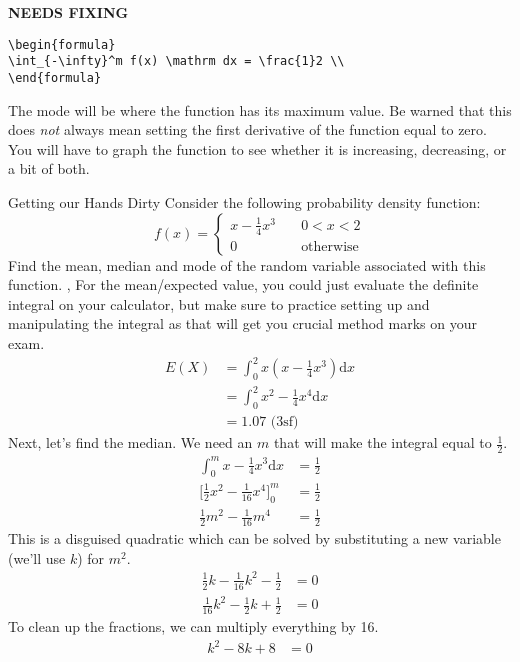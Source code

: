 {\hfill\Large\bfseries NEEDS FIXING\hfill}
\begin{lstlisting}
\begin{formula}
\int_{-\infty}^m f(x) \mathrm dx = \frac{1}2 \\
\end{formula}
 \end{lstlisting}
The mode will be where the function has its maximum value. Be warned that this does \textit{not} always mean setting the first derivative of the function equal to zero. You will have to graph the function to see whether it is increasing, decreasing, or a bit of both.
\begin{example}{Getting our Hands Dirty}
Consider the following probability density function:
$$f(x) = 
        \begin{cases}
            x - \frac{1}{4}x^3 & \quad 0 < x < 2 \\
            0 & \quad \text{otherwise}
        \end{cases}
$$
Find the mean, median and mode of the random variable associated with this function. 
\sep
For the mean/expected value, you could just evaluate the definite integral on your calculator, but make sure to practice setting up and manipulating the integral as that will get you crucial method marks on your exam.
\begin{align}
    E(X) &= \int_0^2 x(x - \frac{1}{4}x^3) \mathrm dx \\
    &= \int_0^2 x^2- \frac{1}{4}x^4 \mathrm dx \\
    &= 1.07 \text{ (3sf)}
\end{align}
Next, let's find the median. We need an $m$ that will make the integral equal to $\frac{1}2$.
\begin{align}
    \int_0^m x - \frac{1}{4}x^3 \mathrm dx &= \frac{1}2 \\
    \Big[\frac{1}{2}x^2 - \frac{1}{16}x^4\Big]_0^m &= \frac{1}2 \\
    \frac{1}{2}m^2 - \frac{1}{16}m^4 &= \frac{1}2
\end{align}
This is a disguised quadratic which can be solved by substituting a new variable (we'll use $k$) for $m^2$.
\begin{align}
    \frac{1}{2}k - \frac{1}{16}k^2 - \frac{1}2 &= 0 \\
    \frac{1}{16}k^2 - \frac{1}{2}k + \frac{1}2 &= 0
\end{align}
To clean up the fractions, we can multiply everything by 16.
\begin{align}
   k^2 - 8k + 8 &= 0

\end{align}
\end{example}
